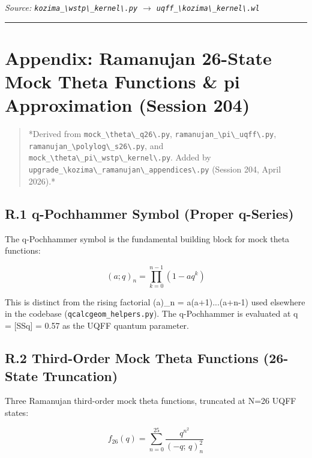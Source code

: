 \documentclass[12pt,a4paper]{article}
\begin{document}
\emph{Source: \texttt{kozima\_\textbackslash {wstp\textbackslash \_kernel\textbackslash }.py} $\to$ \texttt{uqff\_\textbackslash {kozima\textbackslash \_kernel\textbackslash }.wl}}

\medskip\hrule\medskip

\section{Appendix: Ramanujan 26-State Mock Theta Functions \& pi Approximation (Session 204)}

\begin{quote}
*Derived from \texttt{mock\_\textbackslash {theta\textbackslash \_q26\textbackslash }.py}, \texttt{ramanujan\_\textbackslash {pi\textbackslash \_uqff\textbackslash }.py}, \texttt{ramanujan\_\textbackslash {polylog\textbackslash \_s26\textbackslash }.py},
and \texttt{mock\_\textbackslash {theta\textbackslash \_pi\textbackslash \_wstp\textbackslash \_kernel\textbackslash }.py}. Added by \texttt{upgrade\_\textbackslash {kozima\textbackslash \_ramanujan\textbackslash \_appendices\textbackslash }.py}
(Session 204, April 2026).*
\end{quote}

\subsection{R.1 q-Pochhammer Symbol (Proper q-Series)}

The q-Pochhammer symbol is the fundamental building block for mock theta functions:

\begin{equation}
(a; q)_n = \prod_{k=0}^{n-1} (1 - a q^k)
\end{equation}

This is distinct from the rising factorial (a)\_n = a(a+1)...(a+n-1) used elsewhere in the codebase (\texttt{qcalcgeom\_helpers.py}). The q-Pochhammer is evaluated at q = [SSq] = 0.57 as the UQFF quantum parameter.

\subsection{R.2 Third-Order Mock Theta Functions (26-State Truncation)}

Three Ramanujan third-order mock theta functions, truncated at N=26 UQFF states:

\begin{equation}
f_{26}(q) = \sum_{n=0}^{25} \frac{q^{n^2}}{(-q;\,q)_n^2}
\end{equation}
\end{document}
